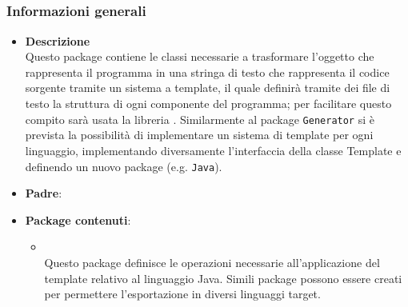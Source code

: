 \subsection{}
\label{\nogloxy{swedesigner::server::template}}
\subsubsection{Informazioni generali}
\begin{itemize}
\item \textbf{Descrizione}\\
Questo package contiene le classi necessarie a trasformare l'oggetto che rappresenta il programma in una stringa di testo che rappresenta il codice sorgente tramite un sistema a template, il quale definirà tramite dei file di testo la struttura di ogni componente del programma; per facilitare questo compito sarà usata la libreria \stringtemplate{}. Similarmente al package \texttt{Generator} si è prevista la possibilità di implementare un sistema di template per ogni linguaggio, implementando diversamente l'interfaccia della classe Template e definendo un nuovo package (e.g. \texttt{Java}).
\item \textbf{Padre}: \hyperref[\nogloxy{swedesigner::server}]{}
\item \textbf{Package contenuti}:
\begin{itemize}
\item \hyperref[\nogloxy{swedesigner::server::template::java}]{}\\
Questo package definisce le operazioni necessarie all'applicazione del template relativo al linguaggio Java. Simili package possono essere creati per permettere l'esportazione in diversi linguaggi target.
\end{itemize}
\end{itemize}
